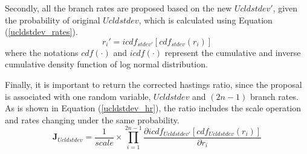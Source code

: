 \documentclass{bmcart}
\begin{document}
\begin{backmatter}
Secondly, all the branch rates are proposed based on the new $Ucldstdev'$, given the probability of original $Ucldstdev$, which is calculated using Equation (\ref{ucldstdev_rates}).
\begin{equation}\label{ucldstdev_rates}
r_{i}' = icd{f_{stdev'}}\left[ {cd{f_{stdev}}({r_i})} \right]
\end{equation}
where the notations $cdf(\cdot)$ and $icdf(\cdot)$ represent the cumulative and inverse cumulative density function of log normal distribution.

Finally, it is important to return the corrected hastings ratio, since the proposal is associated with one random variable, $Ucldstdev$ and $(2n-1)$ branch rates. As is shown in Equation (\ref{ucldstdev_hr}), the ratio includes the scale operation and rates changing under the same probability.
\begin{equation}\label{ucldstdev_hr}
{{\mathbf{J}}_{Ucldstdev}} = \frac{1}{{scale}} \times \prod\limits_{i = 1}^{2n - 1} {\frac{{\partial icd{f_{Ucldstdev'}}[cd{f_{Ucldstdev}}({r_i})]}}{{\partial {r_i}}}}
\end{equation}


\end{backmatter}
\end{document}
